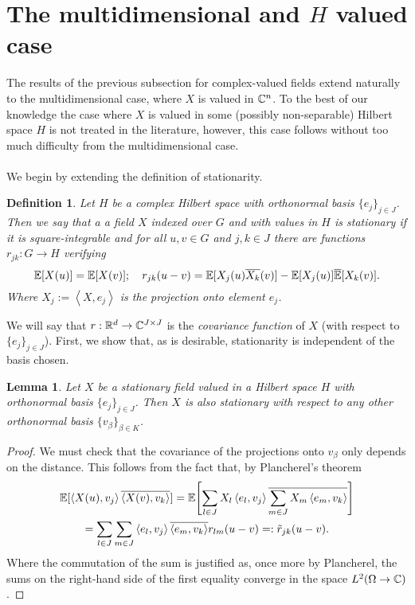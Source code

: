 \documentclass[12pt]{article}
\newtheorem{lemma}{Lemma}
\newtheorem{definition}{Definition}
\newcommand{\br}[1]{\left\langle#1\right\rangle}
\begin{document}
\section{The multidimensional and $H$ valued case}
The results of the previous subsection for complex-valued fields extend naturally to the multidimensional case, where $X$ is valued in $\mathbb{C}^n$. To the best of our knowledge the case where $X$ is valued in some (possibly non-separable) Hilbert space $H$ is not treated in the literature, however, this case follows without too much difficulty from the multidimensional case. \\
\\
We begin by extending the definition of  stationarity.

\begin{definition}
	Let $H$ be a complex Hilbert space with orthonormal basis $\{e_j\}_{j\in J}$. Then we say that a a field $X$  indexed over $G$ and with values in $H$ is stationary if it is square-integrable and for all $u,v \in G$ and $j, k\in J$ there are functions $r_{jk}: G\to H$ verifying
	\begin{equation*}
		\mathbb{E}[X(u)]=\mathbb{E}[X(v)];\quad r_{jk}(u-v)=\mathbb{E}[{X_{j}(u)\overline{X_k}(v)}]-\mathbb{E}[{X_{j}(u)]\overline{\mathbb{E}}[{X_k}(v)}].
	\end{equation*}
	Where $X_j:=\br{X,e_j}$ is the projection onto element $e_j$.
\end{definition}
We will say that $r:{\mathbb R}^d\to\mathbb{C}^{J\times J}$ is the \emph{covariance function} of $X$ (with respect to $\{e_j\}_{j\in J}$). First, we show that, as is desirable, stationarity is independent of the basis chosen.
\begin{lemma}
	Let $X$ be a stationary field valued in a Hilbert space $H$ with orthonormal basis $\{e_j\}_{j\in J}$. Then $X$ is also stationary with respect to any other orthonormal basis $\{v_\beta\}_{\beta\in K}$.
\end{lemma}
\begin{proof}
	We must check that the covariance of the projections onto $v_\beta$ only depends on the distance. This follows from the fact that, by Plancherel's theorem
	\begin{multline*}
		\E[\br{X(u),v_j}\overline{\br{X(v),v_k}}]=\E\qty[\sum_{l \in  J}X_l\br{e_l,v_j}\overline{\sum_{m\in J}X_m \br{e_m,v_k} }]\\= \sum_{l \in  J}\sum_{m \in  J} \br{e_l,v_j} \overline{\br{e_m,v_k}}r_{l m}(u-v)=:\tilde{r}_{ j k }(u-v) .
	\end{multline*}
	Where the commutation of the sum is justified  as, once more by Plancherel, the sums on the right-hand side of the first equality  converge in the space $L^2(\Omega\to\mathbb{C})$.
\end{proof}
\end{document}
